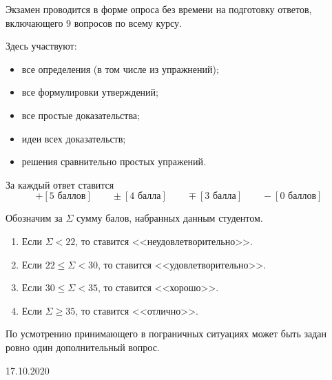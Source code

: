 
\usepackage{dashrule}

\renewcommand{\coursetitle}{\textsc{StT}}





Экзамен проводится в форме опроса без времени на подготовку ответов, включающего $9$ вопросов по всему курсу.

Здесь участвуют: 
\begin{itemize}
    \item все определения (в том числе из упражнений);
    \item все формулировки утверждений;
    \item все простые доказательства;
    \item идеи всех доказательств;        
    \item решения сравнительно простых упражений.
\end{itemize}

За каждый ответ ставится
$$
    + [5 \text{ баллов}] \qquad \pm [4 \text{ балла}] \qquad
    \mp [3 \text{ балла}] \qquad - [0 \text{ баллов}]
$$

Обозначим за $\Sigma$ сумму балов, набранных данным студентом.

\begin{enumerate}[label = {\realasbuk*)}, ref = \realasbuk*]
    \item Если $\Sigma < 22$, то ставится <<неудовлетворительно>>.
    \item Если $22 \le \Sigma < 30$, то ставится <<удовлетворительно>>.
    \item Если $30 \le \Sigma < 35$, то ставится <<хорошо>>.
    \item Если $\Sigma \ge 35$, то ставится <<отлично>>.
\end{enumerate}


По усмотрению принимающего в пограничных ситуациях может быть задан ровно один
дополнительный вопрос.

\vspace{0.1cm}


\vspace{0.05cm}

\begin{flushright}
    17.10.2020
\end{flushright}

\vspace{2cm}

\begin{center}
\end{center}



